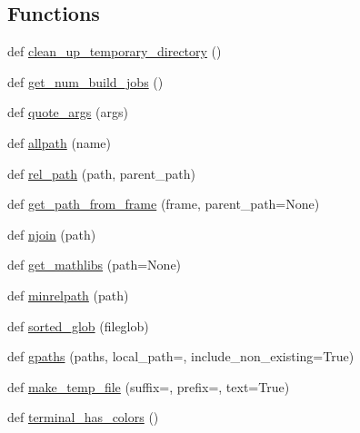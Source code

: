 \subsection*{Functions}
\begin{DoxyCompactItemize}
\item 
def \hyperlink{namespacenumpy_1_1distutils_1_1misc__util_ab16d6746751769bb24a39d24935490dd}{clean\+\_\+up\+\_\+temporary\+\_\+directory} ()
\item 
def \hyperlink{namespacenumpy_1_1distutils_1_1misc__util_a3bb0556bd8f92c36422281395c1eb986}{get\+\_\+num\+\_\+build\+\_\+jobs} ()
\item 
def \hyperlink{namespacenumpy_1_1distutils_1_1misc__util_a22e7f7be44dcf1fc77957f9300fb3675}{quote\+\_\+args} (args)
\item 
def \hyperlink{namespacenumpy_1_1distutils_1_1misc__util_ab5395e7fcff6d61e2e1cfba166d9cdce}{allpath} (name)
\item 
def \hyperlink{namespacenumpy_1_1distutils_1_1misc__util_a6132d34eab8a4f01ad456ba66b3bcd9c}{rel\+\_\+path} (path, parent\+\_\+path)
\item 
def \hyperlink{namespacenumpy_1_1distutils_1_1misc__util_af2afbcadab9f2c9c77d7deb631d35451}{get\+\_\+path\+\_\+from\+\_\+frame} (frame, parent\+\_\+path=None)
\item 
def \hyperlink{namespacenumpy_1_1distutils_1_1misc__util_a545892a48a7dcc6bb17b92b2145789ba}{njoin} (path)
\item 
def \hyperlink{namespacenumpy_1_1distutils_1_1misc__util_a94f49d5b2268a4e9f90636874351582c}{get\+\_\+mathlibs} (path=None)
\item 
def \hyperlink{namespacenumpy_1_1distutils_1_1misc__util_a6e56102f9a53b972a3321e0b3ec958c3}{minrelpath} (path)
\item 
def \hyperlink{namespacenumpy_1_1distutils_1_1misc__util_a67d297cfe151216e85255672388dd773}{sorted\+\_\+glob} (fileglob)
\item 
def \hyperlink{namespacenumpy_1_1distutils_1_1misc__util_aa9bd57a8ec6fdbfb570c903aa651868d}{gpaths} (paths, local\+\_\+path=\textquotesingle{}\textquotesingle{}, include\+\_\+non\+\_\+existing=True)
\item 
def \hyperlink{namespacenumpy_1_1distutils_1_1misc__util_a32b601975194bec7e2ed3f00c3420759}{make\+\_\+temp\+\_\+file} (suffix=\textquotesingle{}\textquotesingle{}, prefix=\textquotesingle{}\textquotesingle{}, text=True)
\item 
def \hyperlink{namespacenumpy_1_1distutils_1_1misc__util_ae8b5397c1cd49b5db66040e723b1a303}{terminal\+\_\+has\+\_\+colors} ()

\end{DoxyCompactItemize}
